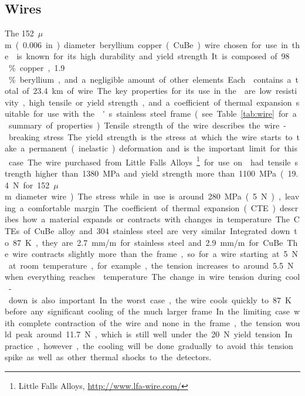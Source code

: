 \subsection{Wires}
\label{sec:fdsp-apa-wires}

The \SI{152}{$\mu$m} (\SI{.006}{in}) diameter beryllium copper (CuBe) wire chosen for use in the  is known for its high durability and yield strength. It is composed of \num{98}\,\% copper, \num{1.9}\,\% beryllium, and a negligible amount of other elements. Each  contains a total of \SI{23.4}{km} of wire.  

The key properties for its use in the  are low resistivity, high tensile or yield strength, and a coefficient of thermal expansion suitable for use with the 's stainless steel frame (see Table~\ref{tab:wire} for a summary of properties).  Tensile strength of the wire describes the wire-breaking stress.  The yield strength is the stress at which the wire starts to take a permanent (inelastic) deformation and is the important limit for this case. The wire purchased from Little Falls Alloys~\footnote{Little Falls Alloys\texttrademark, \url{http://www.lfa-wire.com/}} for use on  had tensile strength higher than \SI{1380}{MPa} and yield strength more than \SI{1100}{MPa} (\SI{19.4}{N} for \SI{152}{$\mu$m} diameter wire).  The stress while in use is around \SI{280}{MPa} (\SI{5}{N}), leaving a comfortable margin.

The coefficient of thermal expansion (CTE) describes how a material expands or contracts with changes in temperature.  The CTEs of CuBe alloy and \num{304} stainless steel are very similar.  Integrated down to \SI{87}{K}, they are \SI{2.7}{mm/m} for stainless steel and \SI{2.9}{mm/m} for CuBe. The wire contracts slightly more than the frame, so for a wire starting at \SI{5}{N} at room temperature, for example, the tension increases to around \SI{5.5}{N} when everything reaches \lar temperature.  

The change in wire tension during cool-down is also important.  In the worst case, the wire cools quickly to \SI{87}{K} before any significant cooling of the much larger frame.  In the limiting case with complete contraction of the wire and none in the frame, the tension would peak around \SI{11.7}{N}, which is still well under the \SI{20}{N} yield tension. In practice, however, the cooling will be done gradually to avoid this tension spike as well as other thermal shocks to the detectors.

